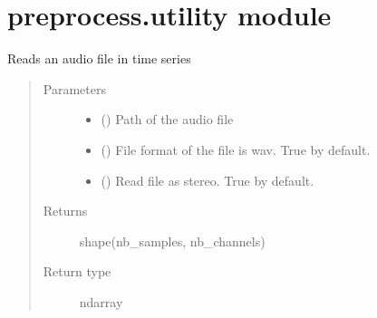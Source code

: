 \documentclass[letterpaper,10pt,english]{sphinxmanual}
\begin{document}
\section{preprocess.utility module}
\label{\detokenize{docs/source/preprocess:module-preprocess.utility}}\label{\detokenize{docs/source/preprocess:preprocess-utility-module}}

\begin{fulllineitems}
\label{\detokenize{docs/source/preprocess:preprocess.utility.read}}
Reads an audio file in time series
\begin{quote}\begin{description}
\item[{Parameters}] \leavevmode\begin{itemize}
\item {} 
 () \textendash{} Path of the audio file

\item {} 
 () \textendash{} File format of the file is wav.
True by default.

\item {} 
 () \textendash{} Read file as stereo. True by default.

\end{itemize}

\item[{Returns}] \leavevmode
shape(nb\_samples, nb\_channels)

\item[{Return type}] \leavevmode
ndarray

\end{description}\end{quote}

\end{fulllineitems}

\end{document}
